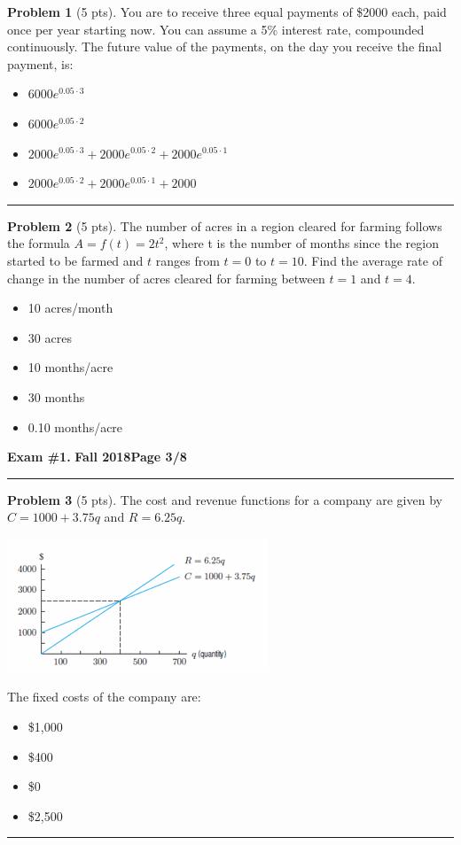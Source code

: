 \documentclass[12pt]{article}
\makeatletter
\theoremstyle{definition}
\newtheorem{problem}{Problem}
\newcommand*{\radiobutton}{%
  \@ifstar{\@radiobutton0}{\@radiobutton1}%
}
\newcommand*{\@radiobutton}[1]{%
  \begin{tikzpicture}
    \pgfmathsetlengthmacro\radius{height("X")/2}
    \draw[radius=\radius] circle;
    \ifcase#1 \fill[radius=.6*\radius] circle;\fi
  \end{tikzpicture}%
}
\makeatother
\begin{document}
\begin{problem}[5 pts]
You are to receive three equal payments of \$2000 each, paid once per year starting now. You can assume a 5\% interest rate, compounded continuously. The future value of the payments, on the day you receive the final payment, is:
\begin{itemize}
\item[\radiobutton] $6000 e^{0.05 \cdot 3}$
\item[\radiobutton] $6000 e^{0.05 \cdot 2}$
\item[\radiobutton] $2000 e^{0.05 \cdot 3} + 2000 e^{0.05 \cdot 2} + 2000 e^{0.05 \cdot 1}$
\item[\radiobutton] $2000 e^{0.05 \cdot 2} + 2000 e^{0.05 \cdot 1} + 2000$
\end{itemize}
\end{problem}
\hrule

\begin{problem}[5 pts]
The number of acres in a region cleared for farming follows the formula $A = f (t) = 2t^2$, where t is the number of months since the region started to be farmed and $t$ ranges from $t = 0$ to $t = 10$. Find the average rate of change in the number of acres cleared for farming between $t = 1$ and $t = 4$. 
\begin{itemize}
\item[\radiobutton] 10 acres/month
\item[\radiobutton] 30 acres
\item[\radiobutton] 10 months/acre
\item[\radiobutton] 30 months
\item[\radiobutton] 0.10 months/acre
\end{itemize}
\end{problem}

\newpage

\hfill{\large\bf Exam \#1.}\hfill{\large\bf
  Fall 2018}\hfill{\large\bf Page 3/8}\hrule

\bigskip
\begin{problem}[5 pts]
The cost and revenue functions for a company are given by $C = 1000 + 3.75q$ and $R = 6.25q$.
\begin{center}
\includegraphics{1graph1.png}
\end{center}
The fixed costs of the company are:
\begin{itemize}
\item[\radiobutton] \$1,000 
\item[\radiobutton] \$400
\item[\radiobutton] \$0
\item[\radiobutton] \$2,500
\end{itemize}
\end{problem}
\hrule
\end{document}
